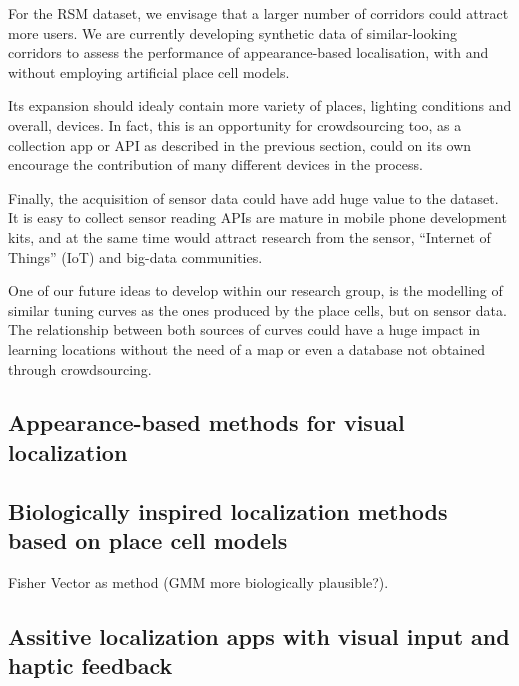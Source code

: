 For the RSM dataset, we envisage that a larger number of corridors could attract more users. We are currently developing synthetic data of similar-looking corridors to assess the performance of appearance-based localisation, with and without employing artificial place cell models.

Its expansion should idealy contain more variety of places, lighting conditions and overall, devices. In fact, this is an opportunity for crowdsourcing too, as a collection app or API as described in the previous section, could on its own encourage the contribution of many different devices in the process.

Finally, the acquisition of sensor data could have add huge value to the dataset. It is easy to collect sensor reading APIs are mature in mobile phone development kits, and at the same time would attract research from the sensor, ``Internet of Things'' (IoT) and big-data communities.

One of our future ideas to develop within our research group, is the modelling of similar tuning curves as the ones produced by the place cells, but on sensor data. The relationship between both sources of curves could have a huge impact in learning locations without the need of a map or even a database not obtained through crowdsourcing.

\subsection{Appearance-based methods for visual localization}

\subsection{Biologically inspired localization methods based on place cell models}
Fisher Vector as method (GMM more biologically plausible?).
\subsection{Assitive localization apps with visual input and haptic feedback}


